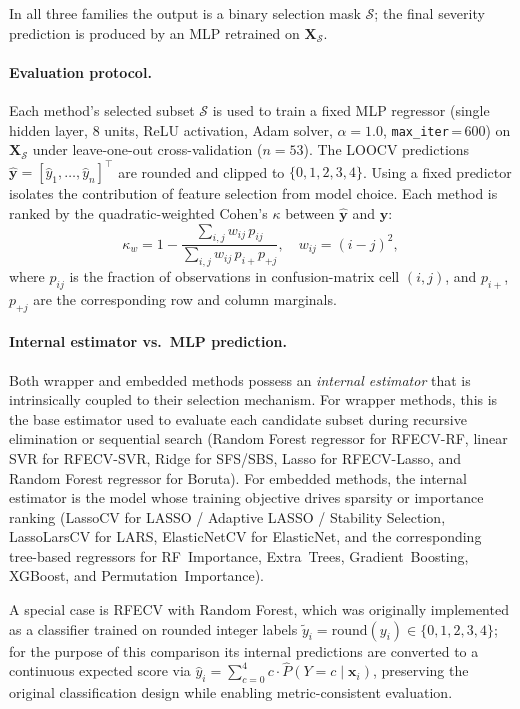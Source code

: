 \documentclass[12pt, a4paper]{article}
\begin{document}
In all three families the output is a binary selection mask $\mathcal{S}$; the final
severity prediction is produced by an MLP retrained on $\mathbf{X}_{\mathcal{S}}$.

\paragraph{Evaluation protocol.}
Each method's selected subset $\mathcal{S}$ is used to train a fixed MLP regressor
(single hidden layer, 8 units, ReLU activation, Adam solver, $\alpha = 1.0$,
\texttt{max\_iter}\,=\,600) on $\mathbf{X}_{\mathcal{S}}$ under leave-one-out
cross-validation ($n = 53$).
The LOOCV predictions $\hat{\mathbf{y}} = [\hat{y}_1, \ldots, \hat{y}_n]^{\top}$ are
rounded and clipped to $\{0,1,2,3,4\}$.
Using a fixed predictor isolates the contribution of feature selection from model choice.
Each method is ranked by the quadratic-weighted Cohen's $\kappa$ between
$\hat{\mathbf{y}}$ and $\mathbf{y}$:
\begin{equation}
    \kappa_w = 1 - \frac{\sum_{i,j} w_{ij}\,p_{ij}}{\sum_{i,j} w_{ij}\,p_{i+}p_{+j}},
    \quad w_{ij} = (i - j)^2,
    \label{eq:kappa}
\end{equation}
where $p_{ij}$ is the fraction of observations in confusion-matrix cell $(i,j)$,
and $p_{i+}$, $p_{+j}$ are the corresponding row and column marginals.

\paragraph{Internal estimator vs.\ MLP prediction.}
Both wrapper and embedded methods possess an \emph{internal estimator} that is
intrinsically coupled to their selection mechanism.
For wrapper methods, this is the base estimator used to evaluate each candidate
subset during recursive elimination or sequential search
(Random Forest regressor for RFECV-RF, linear SVR for RFECV-SVR, Ridge for SFS/SBS,
Lasso for RFECV-Lasso, and Random Forest regressor for Boruta).
For embedded methods, the internal estimator is the model whose training objective
drives sparsity or importance ranking
(LassoCV for LASSO / Adaptive LASSO / Stability Selection,
LassoLarsCV for LARS, ElasticNetCV for ElasticNet,
and the corresponding tree-based regressors for RF~Importance, Extra~Trees,
Gradient~Boosting, XGBoost, and Permutation~Importance).

\noindent A special case is RFECV with Random Forest, which was originally implemented
as a classifier trained on rounded integer labels $\tilde{y}_i = \mathrm{round}(y_i)
\in \{0,1,2,3,4\}$; for the purpose of this comparison its internal predictions are
converted to a continuous expected score via
$\hat{y}_i = \sum_{c=0}^{4} c \cdot \hat{P}(Y{=}c \mid \mathbf{x}_i)$,
preserving the original classification design while enabling metric-consistent evaluation.
\end{document}
